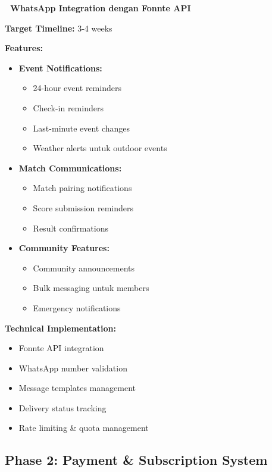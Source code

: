 \documentclass[12pt,a4paper]{article}
\begin{document}
\begin{planned}
\textbf{🔄 WhatsApp Integration dengan Fonnte API}

\textbf{Target Timeline:} 3-4 weeks

\textbf{Features:}
\begin{itemize}
    \item \textbf{Event Notifications:}
    \begin{itemize}
        \item 24-hour event reminders
        \item Check-in reminders
        \item Last-minute event changes
        \item Weather alerts untuk outdoor events
    \end{itemize}
    \item \textbf{Match Communications:}
    \begin{itemize}
        \item Match pairing notifications
        \item Score submission reminders
        \item Result confirmations
    \end{itemize}
    \item \textbf{Community Features:}
    \begin{itemize}
        \item Community announcements
        \item Bulk messaging untuk members
        \item Emergency notifications
    \end{itemize}
\end{itemize}

\textbf{Technical Implementation:}
\begin{itemize}
    \item Fonnte API integration
    \item WhatsApp number validation
    \item Message templates management
    \item Delivery status tracking
    \item Rate limiting \& quota management
\end{itemize}
\end{planned}

\subsection{Phase 2: Payment \& Subscription System}
\end{document}
